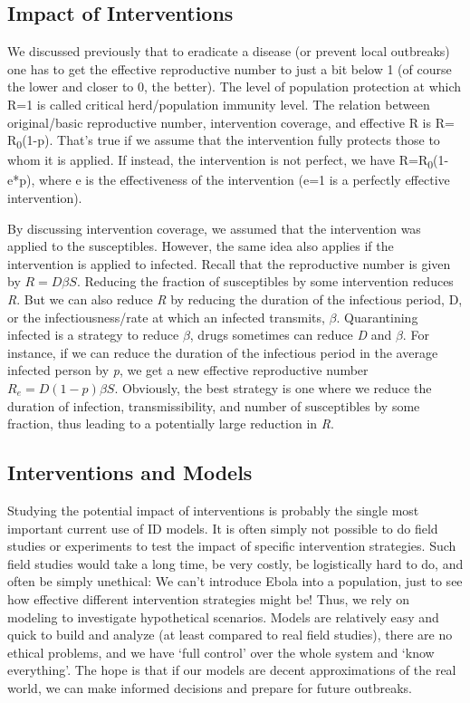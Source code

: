 \documentclass[]{article}
\theoremstyle{definition}
\theoremstyle{definition}
\theoremstyle{definition}
\theoremstyle{remark}
\begin{document}
\subsection{Impact of Interventions}\label{impact-of-interventions}

We discussed previously that to eradicate a disease (or prevent local
outbreaks) one has to get the effective reproductive number to just a
bit below 1 (of course the lower and closer to 0, the better). The level
of population protection at which R=1 is called critical herd/population
immunity level. The relation between original/basic reproductive number,
intervention coverage, and effective R is R= R\textsubscript{0}(1-p).
That's true if we assume that the intervention fully protects those to
whom it is applied. If instead, the intervention is not perfect, we have
R=R\textsubscript{0}(1-e*p), where e is the effectiveness of the
intervention (e=1 is a perfectly effective intervention).

By discussing intervention coverage, we assumed that the intervention
was applied to the susceptibles. However, the same idea also applies if
the intervention is applied to infected. Recall that the reproductive
number is given by \(R = D \beta S\). Reducing the fraction of
susceptibles by some intervention reduces \emph{R}. But we can also
reduce \emph{R} by reducing the duration of the infectious period, D, or
the infectiousness/rate at which an infected transmits, \(\beta\).
Quarantining infected is a strategy to reduce \(\beta\), drugs sometimes
can reduce \emph{D} and \(\beta\). For instance, if we can reduce the
duration of the infectious period in the average infected person by
\emph{p}, we get a new effective reproductive number
\(R_{e} = D(1-p) \beta S\). Obviously, the best strategy is one where we
reduce the duration of infection, transmissibility, and number of
susceptibles by some fraction, thus leading to a potentially large
reduction in \emph{R}.

\subsection{Interventions and Models}\label{interventions-and-models}

Studying the potential impact of interventions is probably the single
most important current use of ID models. It is often simply not possible
to do field studies or experiments to test the impact of specific
intervention strategies. Such field studies would take a long time, be
very costly, be logistically hard to do, and often be simply unethical:
We can't introduce Ebola into a population, just to see how effective
different intervention strategies might be! Thus, we rely on modeling to
investigate hypothetical scenarios. Models are relatively easy and quick
to build and analyze (at least compared to real field studies), there
are no ethical problems, and we have `full control' over the whole
system and `know everything'. The hope is that if our models are decent
approximations of the real world, we can make informed decisions and
prepare for future outbreaks.
\end{document}
